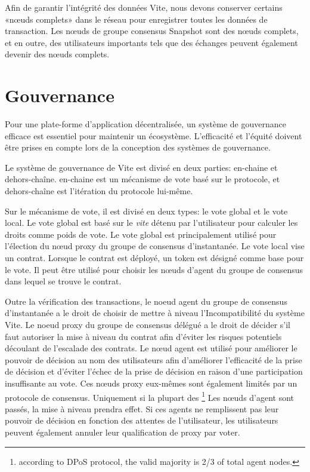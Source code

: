 \documentclass[UTF8,nofonts]{article}
\begin{document}
\begin{multicols}{2}
Afin de garantir l'intégrité des données Vite, nous devons conserver certains «nœuds complets» dans le réseau pour enregistrer toutes les données de transaction. Les nœuds de groupe consensus Snapshot sont des nœuds complets, et en outre, des utilisateurs importants tels que des échanges peuvent également devenir des nœuds complets.

\section{Gouvernance}
Pour une plate-forme d'application décentralisée, un système de gouvernance efficace est essentiel pour maintenir un écosystème. L'efficacité et l'équité doivent être prises en compte lors de la conception des systèmes de gouvernance.

Le système de gouvernance de Vite est divisé en deux parties: en-chaine et dehors-chaîne. en-chaine est un mécanisme de vote basé sur le protocole, et dehors-chaîne est l'itération du protocole lui-même.

Sur le mécanisme de vote, il est divisé en deux types: le vote global et le vote local. Le vote global est basé sur le \textit{vite} détenu par l'utilisateur pour calculer les droits comme poids de vote. Le vote global est principalement utilisé pour l'élection du nœud proxy du groupe de consensus d'instantanée. Le vote local vise un contrat. Lorsque le contrat est déployé, un token est désigné comme base pour le vote. Il peut être utilisé pour choisir les nœuds d'agent du groupe de consensus dans lequel se trouve le contrat.

Outre la vérification des transactions, le noeud agent du groupe de consensus d'instantanée a le droit de choisir de mettre à niveau l'Incompatibilité du système Vite. Le noeud proxy du groupe de consensus délégué a le droit de décider s'il faut autoriser la mise à niveau du contrat afin d'éviter les risques potentiels découlant de l'escalade des contrats. Le nœud agent est utilisé pour améliorer le pouvoir de décision au nom des utilisateurs afin d'améliorer l'efficacité de la prise de décision et d'éviter l'échec de la prise de décision en raison d'une participation insuffisante au vote. Ces nœuds proxy eux-mêmes sont également limités par un protocole de consensus. Uniquement si la plupart des \footnote{according to DPoS protocol, the valid majority is 2/3 of total agent nodes.} Les nœuds d'agent sont passés, la mise à niveau prendra effet. Si ces agents ne remplissent pas leur pouvoir de décision en fonction des attentes de l'utilisateur, les utilisateurs peuvent également annuler leur qualification de proxy par voter.


\end{multicols}
\end{document}
